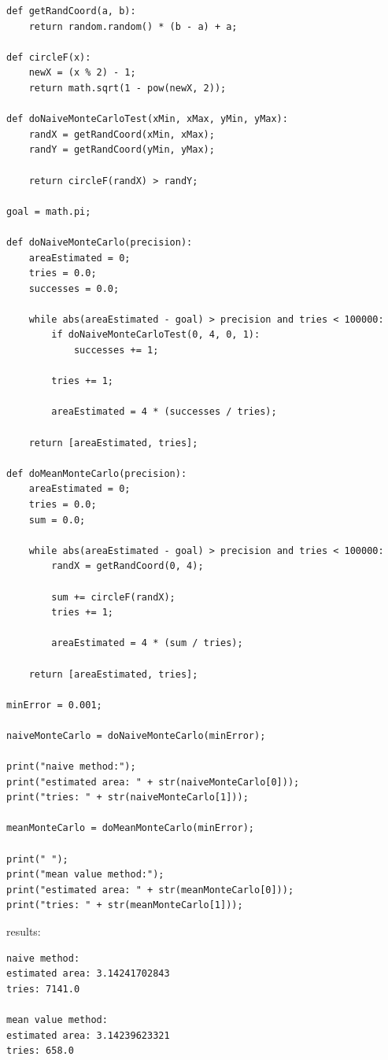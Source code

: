 \begin{lstlisting}[caption=todo]
def getRandCoord(a, b):
	return random.random() * (b - a) + a;

def circleF(x):
	newX = (x % 2) - 1;
	return math.sqrt(1 - pow(newX, 2));

def doNaiveMonteCarloTest(xMin, xMax, yMin, yMax):
	randX = getRandCoord(xMin, xMax);
	randY = getRandCoord(yMin, yMax);
	
	return circleF(randX) > randY;

goal = math.pi;

def doNaiveMonteCarlo(precision):
	areaEstimated = 0;
	tries = 0.0;
	successes = 0.0;

	while abs(areaEstimated - goal) > precision and tries < 100000:
		if doNaiveMonteCarloTest(0, 4, 0, 1):
			successes += 1;
		
		tries += 1;
		
		areaEstimated = 4 * (successes / tries);
	
	return [areaEstimated, tries];

def doMeanMonteCarlo(precision):
	areaEstimated = 0;
	tries = 0.0;
	sum = 0.0;
	
	while abs(areaEstimated - goal) > precision and tries < 100000:
		randX = getRandCoord(0, 4);
		
		sum += circleF(randX);
		tries += 1;
		
		areaEstimated = 4 * (sum / tries);
	
	return [areaEstimated, tries];

minError = 0.001;

naiveMonteCarlo = doNaiveMonteCarlo(minError);

print("naive method:");
print("estimated area: " + str(naiveMonteCarlo[0]));
print("tries: " + str(naiveMonteCarlo[1]));

meanMonteCarlo = doMeanMonteCarlo(minError);

print(" ");
print("mean value method:");
print("estimated area: " + str(meanMonteCarlo[0]));
print("tries: " + str(meanMonteCarlo[1]));
\end{lstlisting}


results:

\begin{lstlisting}[caption=Result of 1.1 a), keywordstyle=\color{black}]
naive method:
estimated area: 3.14241702843
tries: 7141.0

mean value method:
estimated area: 3.14239623321
tries: 658.0
\end{lstlisting}

